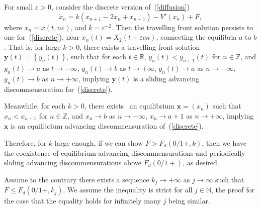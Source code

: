 \documentclass[12pt]{article}
\newcommand{\R}{\mathbb{R}}
\newcommand{\Z}{\mathbb{Z}}
\newcommand{\N}{\mathbb{N}}
\newcommand{\eps}{\varepsilon}
\newcommand{\refer}[1]{~(\ref{#1})}
\newcommand{\xbf}{{\mathbf{x}}}
\newcommand{\ybf}{{\mathbf{y}}}
\begin{document}
For small $\eps>0$, consider the discrete version of\refer{diffusion}
\begin{equation}\label{discrete}
\dot{x}_n=k(x_{n+1}-2x_n+x_{n-1})-V'(x_n)+F,
\end{equation}
where $x_n=x(t,n\eps)$, and $k=\eps^{-2}$.
Then the travelling front solution persists to one for\refer{discrete}, %
 near $x_n(t) = X_2(t+\eps c n)$, connecting the equilibria $a$ to $b$ \cite{CMPS, MP, BCC}.
That is, for large $k>0$, there exists a travelling front solution $\ybf(t)=(y_n(t))$, such that for each $t\in\R$, $y_n(t)<y_{n+1}(t)$ for $n\in\Z$, and $y_n(t)\to a$ as $t\to -\infty$,
$y_n(t)\to b$ as $t\to +\infty$, $y_n(t)\to a$ as $n\to -\infty$, $y_n(t)\to b$ as $n\to +\infty$, implying $\ybf(t)$ is a sliding advancing discommensuration for\refer{discrete}.

 Meanwhile, for each $k>0$, there exists~\cite{BCC} an equilibrium $\xbf=(x_n)$ such that
$x_n<x_{n+1}$ for $n\in\Z$, and $x_n\to b$ as $n\to -\infty$, $x_n\to a+1$ as $n\to +\infty$, implying $\xbf$ is an equilibrium advancing discommensuration of\refer{discrete}. %




{Therefore, for $k$ large enough, if we can show $F>F_d(0/1+, k)$, then we have the coexistence of equilibrium advancing discommensurations and periodically sliding advancing discommensurations above $F_d(0/1+)$, as desired.}



Assume to the contrary there exists a sequence $k_j\to +\infty$ as $j\to\infty$ such that $F\leq F_d(0/1+,k_j)$. We assume the inequality is strict for all $j\in\N$, the proof for the case that the equality holds for infinitely many $j$ being similar.
\end{document}

